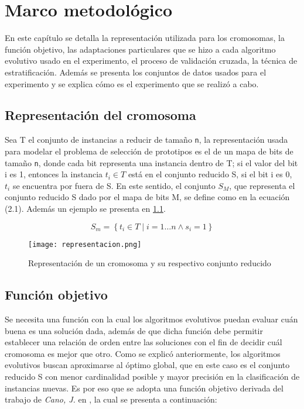 \chapter{Marco metodológico}
\label{capitulo2}

En este capítulo se detalla la representación utilizada para los cromosomas, la función objetivo, las adaptaciones particulares que se hizo a cada algoritmo evolutivo usado en el experimento, el proceso de validación cruzada, la técnica de estratificación. Además se presenta los conjuntos de datos usados para el experimento y se explica cómo es el experimento que se realizó a cabo.

\section{Representación del cromosoma}

Sea T el conjunto de instancias a reducir de tamaño \texttt{n}, la representación usada para modelar el problema de selección de prototipos es el de un mapa de bits de tamaño \texttt{n}, donde cada bit representa una instancia dentro de T; si el valor del bit i es 1, entonces la instancia $t_i \in T$ está en el conjunto reducido S, si el bit i es 0, $t_i$ se encuentra por fuera de S. En este sentido, el conjunto $S_M$, que representa el conjunto reducido S dado por el mapa de bits M, se define como en la ecuación (2.1). Además un ejemplo se presenta en \ref{representacion}.

\begin{equation}
S_m = \left\{ t_i \in T \mid i = 1 \dots n \land s_i = 1 \right\}
\end{equation} 

\begin{figure}[]
\centering
\texttt{[image: representacion.png]}
\caption[Representacion]{Representación de un cromosoma y su respectivo conjunto reducido}
\label{representacion}
\end{figure}

\section{Función objetivo}

Se necesita una función con la cual los algoritmos evolutivos puedan evaluar cuán buena es una solución dada, además de que dicha función debe permitir establecer una relación de orden entre las soluciones con el fin de decidir cuál cromosoma es mejor que otro. Como se explicó anteriormente, los algoritmos evolutivos buscan aproximarse al óptimo global, que en este caso es el conjunto reducido S con menor cardinalidad posible y mayor precisión en la clasificación de instancias nuevas. Es por eso que se adopta una función objetivo derivada del trabajo de \emph{Cano, J.} en \cite{de2004reduccion}, la cual se presenta a continuación:

